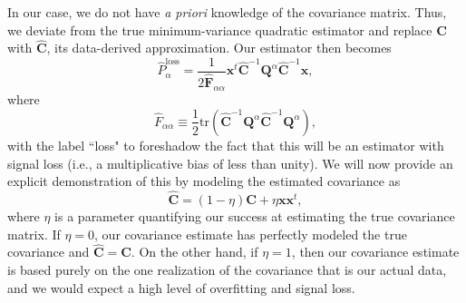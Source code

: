 \documentclass[preprint2,numberedappendix,tighten]{aastex6}
\newcommand{\x}{\mathbf{x}}
\newcommand{\C}{\mathbf{C}}
\newcommand{\Chat}{\mathbf{\widehat{C}}}
\newcommand{\F}{\mathbf{F}}
\newcommand{\Q}{\mathbf{Q}}
\begin{document}
In our case, we do not have \emph{a priori} knowledge of the covariance matrix. Thus, we deviate from the true minimum-variance quadratic estimator and replace $\C$ with $\Chat$, its data-derived approximation. Our estimator then becomes
\begin{equation}
\label{eq:phatloss}
\widehat{P}_\alpha^\textrm{loss} = \frac{1} {2 \widehat{\F}_{\alpha \alpha} }\x^t \Chat^{-1} \Q^{\alpha} \Chat^{-1} \x,
\end{equation}
where
\begin{equation}
\widehat{F}_{\alpha \alpha} \equiv \frac{1}{2} \textrm{tr} \left( \Chat^{-1} \Q^\alpha \Chat^{-1} \Q^\alpha \right),
\end{equation}
with the label ``loss" to foreshadow the fact that this will be an estimator with signal loss (i.e., a multiplicative bias of less than unity). We will now provide an explicit demonstration of this by modeling the estimated covariance as
\begin{equation}
\label{eq:ChatDef}
\Chat = (1-\eta) \C + \eta \x \x^t,
\end{equation}
where $\eta$ is a parameter quantifying our success at estimating the true covariance matrix. If $\eta = 0$, our covariance estimate has perfectly modeled the true covariance and $\Chat = \C$. On the other hand, if $\eta =1$, then our covariance estimate is based purely on the one realization of the covariance that is our actual data, and we would expect a high level of overfitting and signal loss.
\end{document}
